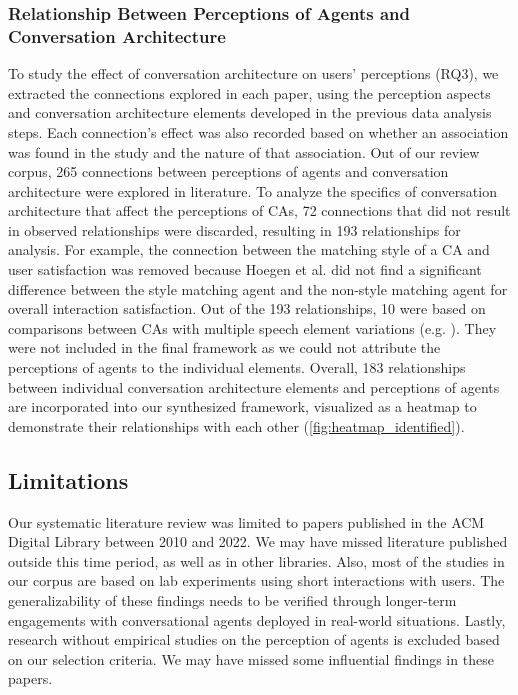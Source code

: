 \subsubsection*{Relationship Between Perceptions of Agents and Conversation Architecture}



To study the effect of conversation architecture on users' perceptions (RQ3), we extracted the connections explored in each paper, using the perception aspects and conversation architecture elements developed in the previous data analysis steps. Each connection's effect was also recorded based on whether an association was found in the study and the nature of that association. Out of our review corpus, 265 connections between perceptions of agents and conversation architecture were explored in literature. To analyze the specifics of conversation architecture that affect the perceptions of CAs, 72 connections that did not result in observed relationships were discarded, resulting in 193 relationships for analysis. For example, the connection between the matching style of a CA and user satisfaction was removed because Hoegen et al. \cite{hoegen2019end}\cmt{[31]} did not find a significant difference between the style matching agent and the non-style matching agent for overall interaction satisfaction. Out of the 193 relationships, 10 were based on comparisons between CAs with multiple speech element variations (e.g. \cite{seeger2021chatbots, volkel2021manipulating}\cmt{[35][68]}). They were not included in the final framework as we could not attribute the perceptions of agents to the individual elements. Overall, 183 relationships between individual conversation architecture elements and perceptions of agents are incorporated into our synthesized framework, visualized as a heatmap to demonstrate their relationships with each other (\autoref{fig:heatmap_identified}).



\subsection{Limitations}

Our systematic literature review was limited to papers published in the ACM Digital Library between 2010 and 2022. We may have missed literature published outside this time period, as well as in other libraries. Also, most of the studies in our corpus are based on lab experiments using short interactions with users. The generalizability of these findings needs to be verified through longer-term engagements with conversational agents deployed in real-world situations. Lastly, research without empirical studies on the perception of agents is excluded based on our selection criteria. We may have missed some influential findings in these papers. %